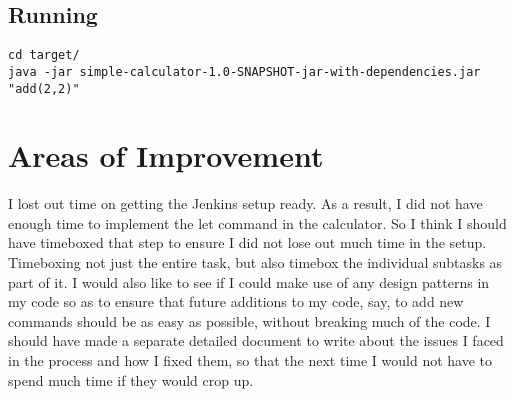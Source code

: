 \documentclass[12pt]{article}
\begin{document}
\subsection{Running}
\begin{verbatim}
cd target/
java -jar simple-calculator-1.0-SNAPSHOT-jar-with-dependencies.jar "add(2,2)"
\end{verbatim}


\section{Areas of Improvement}
I lost out time on getting the Jenkins setup ready. As a result, I did not have enough time to implement the let command in the calculator. So I think I should have timeboxed that step to ensure I did not lose out much time in the setup. Timeboxing not just the entire task, but also timebox the individual subtasks as part of it. I would also like to see if I could make use of any design patterns in my code so as to ensure that future additions to my code, say, to add new commands should be as easy as possible, without breaking much of the code. I should have made a separate detailed document to write about the issues I faced in the process and how I fixed them, so that the next time I would not have to spend much time if they would crop up.
\end{document}
